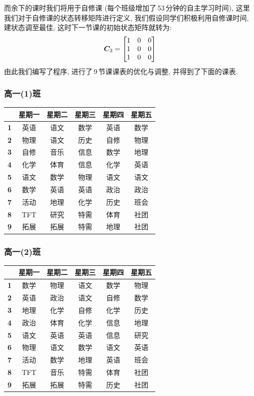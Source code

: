 \documentclass[a4paper]{article}
\renewcommand{\matrix}{\matrixsym} %
\begin{document}
  而余下的课时我们将用于自修课 (每个班级增加了\,53\,分钟的自主学习时间), 这里我们对于自修课的状态转移矩阵进行定义, 我们假设同学们积极利用自修课时间, 建状态调至最佳, 这时下一节课的初始状态矩阵就转为:
  \begin{equation}
  \matrix{C}_3=
  \begin{bmatrix}
  1 & 0 & 0 \\
  1 & 0 & 0 \\
  1 & 0 & 0
  \end{bmatrix}
  \end{equation}
  由此我们编写了程序, 进行了\,9\,节课课表的优化与调整, 并得到了下面的课表.
  \clearpage
  \subsubsection{高一(1)班}
   \begin{tabular}{|c|c|c|c|c|c|}
   \hline
   & \bf 星期一 & \bf 星期二 & \bf 星期三 & \bf 星期四 & \bf 星期五 \\\hline
   \bf 1 & 英语 & 语文 & 数学 & 英语 & 数学 \\\hline
   \bf 2 & 物理 & 语文 & 历史 & 自修 & 物理 \\\hline
   \bf 3 & 自修 & 音乐 & 信息 & 数学 & 地理 \\\hline
   \bf 4 & 化学 & 体育 & 信息 & 化学 & 英语 \\\hline
   \bf 5 & 语文 & 数学 & 物理 & 语文 & 语文 \\\hline
   \bf 6 & 数学 & 英语 & 英语 & 政治 & 政治 \\\hline
   \bf 7 & 活动 & 地理 & 化学 & 历史 & 班会 \\\hline
   \bf 8 & TFT  & 研究 & 特需 & 体育 & 社团 \\\hline
   \bf 9 & 拓展 & 拓展 & 特需 & 地理 & 社团 \\\hline
   \end{tabular}
  \subsubsection{高一(2)班}
   \begin{tabular}{|c|c|c|c|c|c|}
   \hline
   & \bf 星期一 & \bf 星期二 & \bf 星期三 & \bf 星期四 & \bf 星期五 \\\hline
   \bf 1 & 数学 & 物理 & 语文 & 数学 & 物理 \\\hline
   \bf 2 & 英语 & 政治 & 语文 & 自修 & 数学 \\\hline
   \bf 3 & 地理 & 化学 & 自修 & 化学 & 历史 \\\hline
   \bf 4 & 政治 & 体育 & 化学 & 信息 & 地理 \\\hline
   \bf 5 & 语文 & 英语 & 英语 & 信息 & 研究 \\\hline
   \bf 6 & 物理 & 语文 & 数学 & 语文 & 英语 \\\hline
   \bf 7 & 活动 & 数学 & 地理 & 英语 & 班会 \\\hline
   \bf 8 & TFT  & 音乐 & 特需 & 体育 & 社团 \\\hline
   \bf 9 & 拓展 & 拓展 & 特需 & 历史 & 社团 \\\hline
   \end{tabular}
\end{document}
